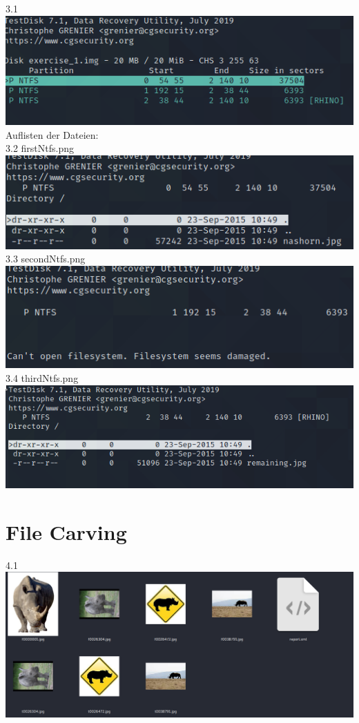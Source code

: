 3.1\\
\includegraphics[scale=0.6]{bilder/3_Ntfs_Testdisk.png } \\
Auflisten der Dateien:\\
3.2 firstNtfs.png\\
\includegraphics[scale=0.6]{bilder/first_Ntfs.png } \\
3.3 secondNtfs.png\\
\includegraphics[scale=0.6]{bilder/second_Ntfs.png } \\
3.4 thirdNtfs.png \\
\includegraphics[scale=0.6]{bilder/third_Ntfs.png } \\


\section{File Carving}
4.1\\
\includegraphics[scale=0.25]{bilder/photorec.png }
